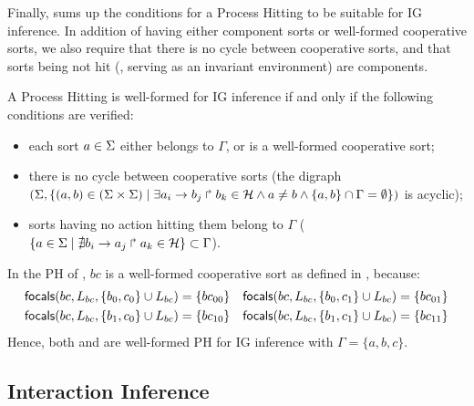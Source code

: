 Finally,  sums up the conditions for a Process Hitting to be suitable for IG
inference.
In addition of having either component sorts or well-formed cooperative sorts, we also require that
there is no cycle between cooperative sorts, and that
sorts being not hit (\ie{}, serving as an invariant environment) are components.

\begin{property}\label{pro:wf-ph}
A Process Hitting is well-formed for IG inference if and only if the following conditions are
verified:
\begin{itemize}
\item 
each sort $a\in\Sigma$ either belongs to $\Gamma$, or is a well-formed cooperative sort;
\item 
there is no cycle between cooperative sorts
(the digraph $(\Sigma,\{(a,b)\in(\Sigma\times\Sigma)\mid \exists a_i\rightarrow b_j\Rsh b_k\in\mathcal{H}
\wedge a\neq b\wedge \{a,b\}\cap\Gamma=\emptyset \})$ is
acyclic);
\item 
sorts having no action hitting them belong to $\Gamma$
($\{ a \in \Sigma\mid \nexists b_i\rightarrow a_j\Rsh a_k\in\mathcal{H}\} \subset \Gamma$).
\end{itemize}
\end{property}

\begin{example*}
In the PH of , $bc$ is a well-formed cooperative sort as defined in , because:
\begin{align*}
\mathsf{focals}(bc, L_{bc}, \{b_0, c_0\} \cup L_{bc}) = \{bc_{00}\} && \mathsf{focals}(bc, L_{bc}, \{b_0, c_1\} \cup L_{bc}) = \{bc_{01}\} \\
\mathsf{focals}(bc, L_{bc}, \{b_1, c_0\} \cup L_{bc}) = \{bc_{10}\} && \mathsf{focals}(bc, L_{bc}, \{b_1, c_1\} \cup L_{bc}) = \{bc_{11}\}
\end{align*}
Hence, both  and  are well-formed PH for IG inference
with $\Gamma = \{a,b,c\}$.
\end{example*}


\subsection{Interaction Inference}\label{ssec:infer-IG}

